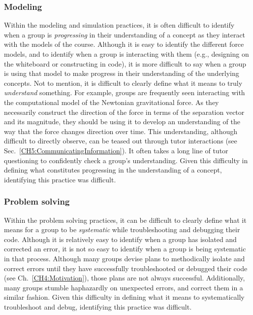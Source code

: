 \documentclass{msuphddissertation}
\begin{document}
\begin{doublespace}
\subsubsection{Modeling}

Within the modeling and simulation practices, it is often difficult to identify when a group is \textit{progressing} in their understanding of a concept as they interact with the models of the course.  Although it is easy to identify the different force models, and to identify when a group is interacting with them (e.g., designing on the whiteboard or constructing in code), it is more difficult to say when a group is using that model to make progress in their understanding of the underlying concepts.  Not to mention, it is difficult to clearly define what it means to truly \textit{understand} something.  For example, groups are frequently seen interacting with the computational model of the Newtonian gravitational force.  As they necessarily construct the direction of the force in terms of the separation vector and its magnitude, they should be using it to develop an understanding of the way that the force changes direction over time.  This understanding, although difficult to directly observe, can be teased out through tutor interactions (see Sec.~\ref{CH5:CommunicatingInformation}).  It often takes a long line of tutor questioning to confidently check a group's understanding.  Given this difficulty in defining what constitutes progressing in the understanding of a concept, identifying this practice was difficult.

\subsubsection{Problem solving}

Within the problem solving practices, it can be difficult to clearly define what it means for a group to be \textit{systematic} while troubleshooting and debugging their code.  Although it is relatively easy to identify when a group has isolated and corrected an error, it is not so easy to identify when a group is being systematic in that process.  Although many groups devise plans to methodically isolate and correct errors until they have successfully troubleshooted or debugged their code (see Ch.~\ref{CH4:Motivation}), those plans are not always successful.  Additionally, many groups stumble haphazardly on unexpected errors, and correct them in a similar fashion.  Given this difficulty in defining what it means to systematically troubleshoot and debug, identifying this practice was difficult.


\end{doublespace}
\end{document}
